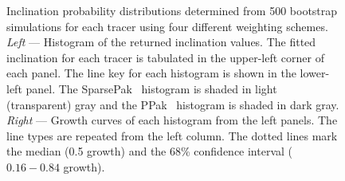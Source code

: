 \documentclass[apj,iop,numberedappendix]{emulateapj}
\begin{document}
\begin{figure}
\caption{
%
Inclination probability distributions determined from 500 bootstrap simulations
for each tracer using four different weighting schemes. {\it Left} --- Histogram
of the returned inclination values.  The fitted inclination for each tracer is
tabulated in the upper-left corner of each panel.  The line key for each
histogram is shown in the lower-left panel.  The SparsePak \halp\ histogram is
shaded in light (transparent) gray and the PPak \oiii\ histogram is shaded in
dark gray.  {\it Right} --- Growth curves of each histogram from the left
panels.  The line types are repeated from the left column.  The dotted lines
mark the median (0.5 growth) and the 68\% confidence interval ($0.16-0.84$
growth).
%
}
\label{fig:idist}
\end{figure}

\end{document}
